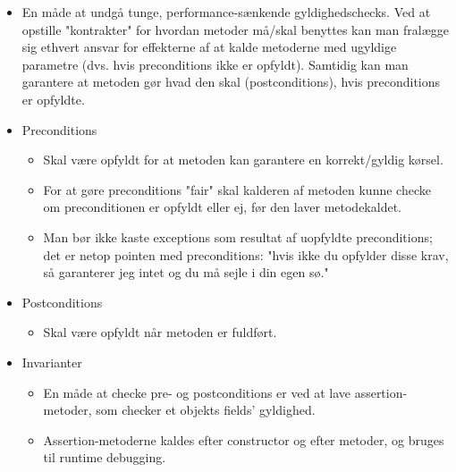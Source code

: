 \begin{itemize}
  \item En måde at undgå tunge, performance-sænkende gyldighedschecks. Ved at opstille "kontrakter" for hvordan metoder må/skal benyttes kan man fralægge sig ethvert ansvar for effekterne af at kalde metoderne med ugyldige parametre (dvs. hvis preconditions ikke er opfyldt). Samtidig kan man garantere at metoden gør hvad den skal (postconditions), hvis preconditions er opfyldte.
  \item Preconditions
  \begin{itemize}
    \item Skal være opfyldt for at metoden kan garantere en korrekt/gyldig kørsel.
    \item For at gøre preconditions "fair" skal kalderen af metoden kunne checke om preconditionen er opfyldt eller ej, før den laver metodekaldet.
    \item Man bør ikke kaste exceptions som resultat af uopfyldte preconditions; det er netop pointen med preconditions: "hvis ikke du opfylder disse krav, så garanterer jeg intet og du må sejle i din egen sø."
  \end{itemize}
  
  \item Postconditions
  \begin{itemize}
    \item Skal være opfyldt når metoden er fuldført.
  \end{itemize}
  
  \item Invarianter
  \begin{itemize}
    \item En måde at checke pre- og postconditions er ved at lave assertion-metoder, som checker et objekts fields' gyldighed.
    \item Assertion-metoderne kaldes efter constructor og efter metoder, og bruges til runtime debugging.
  \end{itemize}
\end{itemize}

